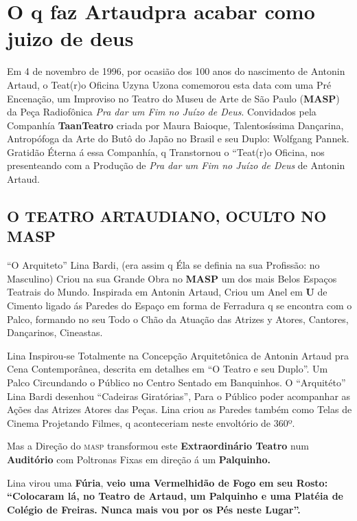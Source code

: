 \chapter[\mbox{O q faz Artaud pra acabar com o juizo de deus}\\por José Celso Martinez Corrêa]{O q faz Artaud\break pra acabar com\break o juizo de deus}

Em 4 de novembro de 1996, por ocasião dos 100 anos do nascimento
de Antonin Artaud, o Teat(r)o Oficina Uzyna Uzona comemorou esta data
com uma Pré Encenação, um Improviso no Teatro do Museu de
Arte de São Paulo (\textbf{MASP}) da Peça Radiofônica \emph{Pra dar
um Fim no Juízo de Deus}. Convidados pela Companhía
\textbf{TaanTeatro} criada por Maura Baioque, Talentosíssima
Dançarina, Antropófoga da Arte do Butô do Japão no Brasil e seu Duplo:
Wolfgang Pannek. Gratidão Éterna á essa Companhía, q
Transtornou o ``Teat(r)o Oficina, nos presenteando com a Produção de
\emph{Pra dar um Fim no Juízo de Deus} de Antonin Artaud.

\section*{O TEATRO ARTAUDIANO, OCULTO NO MASP}

``O Arquiteto'' Lina Bardi, (era assim q Éla se definia
na sua Profissão: no Masculino) Criou na sua Grande Obra no
\textbf{MASP} um dos mais Belos Espaços Teatrais do Mundo. Inspirada em
Antonin Artaud, Criou um Anel em \textbf{U} de Cimento ligado ás Paredes
do Espaço em forma de Ferradura q se encontra com o Palco, formando no
seu Todo o Chão da Atuação das Atrizes y Atores, Cantores, Dançarinos,
Cineastas.

Lina Inspirou-se Totalmente na Concepção Arquitetônica de Antonin Artaud
pra Cena Contemporânea, descrita em detalhes em ``O Teatro e seu
Duplo''. Um Palco Circundando o Público no Centro Sentado em Banquinhos.
O ``Arquitéto'' Lina Bardi desenhou ``Cadeiras Giratórias'', Para o
Público poder acompanhar as Ações das Atrizes Atores das Peças. Lina
criou as Paredes também como Telas de Cinema Projetando Filmes, q
aconteceriam neste envoltório de 360º.

Mas a Direção do \textsc{masp} transformou este \textbf{Extraordinário Teatro}
num \textbf{Auditório} com Poltronas Fixas em direção á um
\textbf{Palquinho.}

Lina virou uma \textbf{Fúria}, \textbf{veio uma Vermelhidão de
Fogo em seu Rosto: ``Colocaram lá, no Teatro de Artaud, um Palquinho e
uma Platéia de Colégio de Freiras. Nunca mais vou por os Pés neste
Lugar''.}

